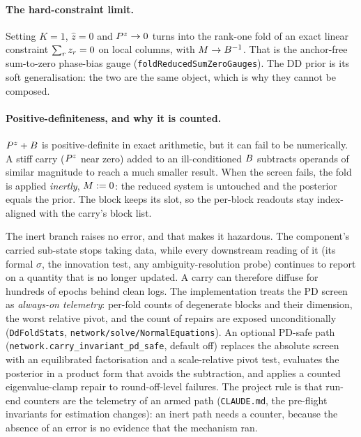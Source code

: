 \documentclass[main.tex]{subfiles}
\begin{document}
\paragraph{The hard-constraint limit.}
Setting $K=1$, $\hat z = 0$ and $P^{z} \to 0$ turns
 into the rank-one fold of an
exact linear constraint $\sum_r z_r = 0$ on local columns, with
$M \to B^{-1}$.  That is the anchor-free sum-to-zero
phase-bias gauge (\texttt{foldReducedSumZeroGauges}).  The DD prior is
its soft generalisation: the two are the same object, which is why they
cannot be composed.

\paragraph{Positive-definiteness, and why it is counted.}
$P^{z} + B$ is positive-definite in exact arithmetic, but it can
fail to be numerically.  A stiff carry ($P^{z}$ near zero) added to an
ill-conditioned $B$ subtracts operands of similar magnitude to
reach a much smaller result.  When the screen fails, the fold is applied
\emph{inertly}, $M := 0$: the reduced system is untouched and
the posterior equals the prior.  The block keeps its slot, so the
per-block readouts stay index-aligned with the carry's block list.

The inert branch raises no error, and that makes it hazardous.  The
component's carried sub-state stops taking data, while every downstream
reading of it (its formal $\sigma$, the innovation test, any
ambiguity-resolution probe) continues to report on a quantity that is
no longer updated.  A carry can therefore diffuse for hundreds of
epochs behind clean logs.  The implementation treats the PD screen as
\emph{always-on telemetry}: per-fold counts of degenerate blocks and
their dimension, the worst relative pivot, and the count of repairs are
exposed unconditionally (\texttt{DdFoldStats},
\texttt{network/solve/NormalEquations}).  An optional PD-safe path
(\texttt{network.carry\_invariant\_pd\_safe}, default off) replaces the
absolute screen with an equilibrated factorisation and a scale-relative
pivot test, evaluates the posterior in a product form that avoids the
subtraction, and applies a counted eigenvalue-clamp repair to
round-off-level failures.  The project rule is that run-end counters are the
telemetry of an armed path (\texttt{CLAUDE.md}, the pre-flight invariants
for estimation changes): an inert path needs a counter, because the
absence of an error is no evidence that the mechanism ran.
\end{document}
